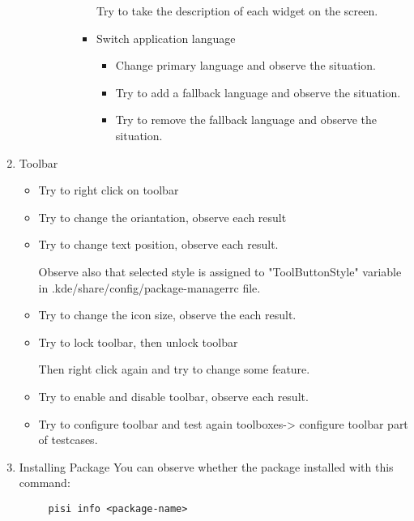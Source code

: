 \documentclass[a4paper,10pt]{article}
\begin{document}
\begin{enumerate}
\begin{enumerate}
\begin{enumerate}
\begin{enumerate}
\begin{itemize}
                    Try to take the description of each widget on the screen.
                    \item Switch application language
                    \begin{itemize}
                        \item Change primary language and observe the situation.
                        \item Try to add a fallback language and observe the situation.
                        \item Try to remove the fallback language and observe the situation.
                    \end{itemize}
                \end{itemize}
        \end{enumerate}
    \end{enumerate}
\end{enumerate}

    \item Toolbar
    \begin{itemize}
        \item Try to right click on toolbar
        \item Try to change the oriantation, observe each result
        \item Try to change text position, observe each result.
    
            Observe also that selected style is assigned to "ToolButtonStyle" variable in .kde/share/config/package-managerrc file.
        \item Try to change the icon size, observe the each result.
        \item Try to lock toolbar, then unlock toolbar
    
            Then right click again and try to change some feature.
        \item Try to enable and disable toolbar, observe each result.
        \item Try to configure toolbar and test again toolboxes-> configure toolbar part of testcases.
    \end{itemize}
    \item Installing Package
	You can observe whether the package installed with this command:
	\begin{verbatim}
	 pisi info <package-name>
	\end{verbatim}


\end{enumerate}
\end{document}
